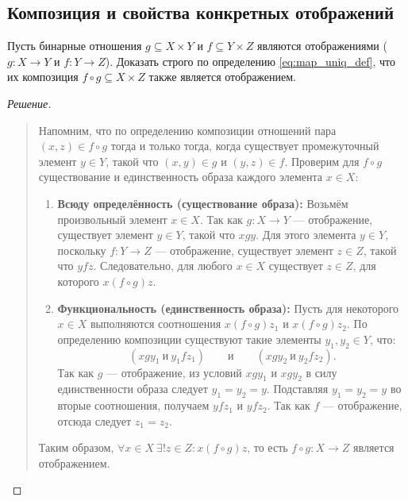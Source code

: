 \subsection{Композиция и свойства конкретных отображений}

\begin{problem}
    Пусть бинарные отношения $g \subseteq X \times Y$ и 
    $f \subseteq Y \times Z$ являются отображениями ($g: X \to Y$ и 
    $f: Y \to Z$). Доказать строго по определению \eqref{eq:map_uniq_def}, 
    что их композиция $f \circ g \subseteq X \times Z$ также является 
    отображением.
\end{problem}

\begin{proof}[Решение]~\\
    \begin{quote}
        Напомним, что по определению композиции отношений пара 
        $(x, z) \in f \circ g$ тогда и только тогда, когда существует 
        промежуточный элемент $y \in Y$, такой что $(x, y) \in g$ и 
        $(y, z) \in f$. Проверим для $f \circ g$ существование и 
        единственность образа каждого элемента $x \in X$:
        \begin{enumerate}
            \item \textbf{Всюду определённость (существование образа):} 
            Возьмём произвольный элемент $x \in X$. Так как $g: X \to Y$ --- 
            отображение, существует элемент $y \in Y$, такой что $x g y$. 
            Для этого элемента $y \in Y$, поскольку $f: Y \to Z$ --- 
            отображение, существует элемент $z \in Z$, такой что $y f z$. 
            Следовательно, для любого $x \in X$ существует $z \in Z$, для 
            которого $x (f \circ g) z$.
            \item \textbf{Функциональность (единственность образа):} 
            Пусть для некоторого $x \in X$ выполняются соотношения 
            $x (f \circ g) z_1$ и $x (f \circ g) z_2$. По определению 
            композиции существуют такие элементы $y_1, y_2 \in Y$, что:
            \[
                (x g y_1 \ \text{и} \ y_1 f z_1) \qquad \text{и} \qquad
                (x g y_2 \ \text{и} \ y_2 f z_2).
            \]
            Так как $g$ --- отображение, из условий $x g y_1$ и $x g y_2$ 
            в силу единственности образа следует $y_1 = y_2 = y$. Подставляя 
            $y_1 = y_2 = y$ во вторые соотношения, получаем $y f z_1$ и 
            $y f z_2$. Так как $f$ --- отображение, отсюда следует 
            $z_1 = z_2$.
        \end{enumerate}
        Таким образом, $\forall x \in X \ \exists! z \in Z : x (f \circ g) z$, 
        то есть $f \circ g: X \to Z$ является отображением.
    \end{quote}
\end{proof}

